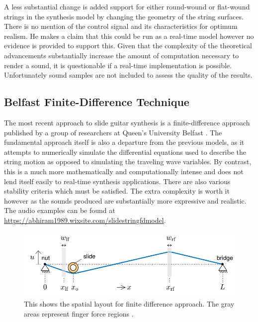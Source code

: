 \documentclass[main.tex]{subfiles}
\begin{document}
A less substantial change is added support for either round-wound or flat-wound strings in the synthesis model by changing the geometry of the string surfaces. There is no mention of the control signal and its characteristics for optimum realism. He makes a claim that this could be run as a real-time model however no evidence is provided to support this. Given that the complexity of the theoretical advancements substantially increase the amount of computation necessary to render a sound, it is questionable if a real-time implementation is possible. Unfortunately sound samples are not included to assess the quality of the results.

\subsection{Belfast Finite-Difference Technique}
The most recent approach to slide guitar synthesis is a finite-difference approach published by a group of researchers at Queen's University Belfast . The fundamental approach itself is also a departure from the previous models, as it attempts to numerically simulate the differential equations used to describe the string motion as opposed to simulating the traveling wave variables. By contrast, this is a much more mathematically and computationally intense and does not lend itself easily to real-time synthesis applications. There are also various stability criteria which must be satisfied. The extra complexity is worth it however as the sounds produced are substantially more expressive and realistic. The audio examples can be found at \url{https://abhiram1989.wixsite.com/slidestringfdmodel}.

\begin{figure}[h]
    \centering
    \includegraphics[scale=.75]{./images/diagrams/FDModel.png}
    \caption{This shows the spatial layout for finite difference approach. The gray areas represent finger force regions .}
    \label{fig:FDModel}
\end{figure}
\end{document}

